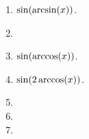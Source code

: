
\begin{multicols}{2}
\begin{enumerate} [ref={\fcProblemRef}]
\item $\sin(\arcsin (x))$. 


\item 
\item $\sin(\arccos (x))$. 

\item $\sin(2\arccos (x))$. 

\item 
\item 
\item 
\end{enumerate}
\end{multicols}